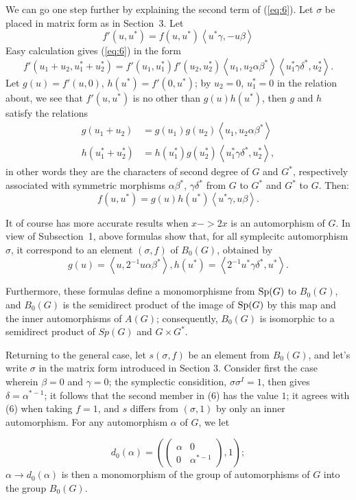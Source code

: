 \documentclass[12pt]{amsart}
\def\inn#1#2{\left\langle{#1},{#2}\right\rangle}
\def\Sp{{\rm Sp}}
\newcounter{ssection}
\renewcommand{\subsection}{
  \addtocounter{ssection}{1}{\bf  \arabic{ssection}.\  }}
\begin{document}
 	
We can go one step further by explaining the second term of (\ref{eq:6}).
Let $\sigma$ be placed in matrix form as in Section~$3$. Let
\[
f'(u,u^*)=f(u,u^*)\inn{u^*\gamma}{-u\beta}
\]
Easy calculation gives (\ref{eq:6}) in the form
\[
f'(u_1+u_2, u^*_1+u^*_2) = f'(u_1,u^*_1)f'(u_2,u^*_2)\inn{u_1}{u_2\alpha\beta^*}
\inn{u^*_1\gamma\delta^*}{u^*_2}.
\]
Let $g(u) = f'(u,0)$, $h(u^*)=f'(0,u^*)$; by $u_2=0$, $u_1^*=0$ in the relation
about, we see that $f'(u,u^*)$ is no other than $g(u)h(u^*)$, then $g$ and $h$
satisfy the relations
\begin{align*}
g(u_1+u_2)&=g(u_1)g(u_2)\inn{u_1}{u_2\alpha\beta^*}\\
h(u^*_1+u^*_2)&=h(u^*_1)g(u^*_2)\inn{u^*_1\gamma\delta^*}{u^*_2},
\end{align*}
in other words they are the characters of second degree of $G$ and $G^*$,
respectively associated with symmetric morphisms $\alpha\beta^*$, 
$\gamma\delta^*$ from $G$ to $G^*$ and $G^*$ to $G$. Then:
\[
f(u,u^*)=g(u)h(u^*)\inn{u^*\gamma}{u\beta}.
\]
	
It of course has more accurate results when $x-> 2x$ is an automorphism of $G$.
In view of Subsection~1, above formulas show that,
 for all symplecitc automorphism $\sigma$, it correspond to an element 
$(\sigma, f)$ of $B_0(G)$, obtained by
\[
g(u)=\inn{u}{2^{-1}u\alpha\beta^*}, h(u^*)=\inn{2^{-1}u^*\gamma\delta^*}{u^*}.
\]
	
Furthermore, these formulas define a monomorphisme from $\Sp(G)$ to $B_0(G)$, 
and $B_0(G)$ is the semidirect product of the image of $\Sp(G)$ by this map 
and the inner automorphisms of $A(G)$; consequently, 
$B_0(G)$ is isomorphic to a semidirect product of $Sp (G)$ and  $G\times G^*$.

\subsection{}
Returning to the general case, let $s(\sigma,f)$ be an element from
$B_{0}(G)$, and let's write $\sigma$ in the matrix form introduced
in Section 3. Consider first the case wherein $\beta=0$ and $\gamma=0$;
the symplectic considition, $\sigma\sigma^{I}=1$, then gives $\delta=\alpha^{*-1}$;
it follows that the second member in (6) has the value $1$; it agrees
with (6) when taking $f=1$, and $s$ differs from $(\sigma,1)$ by
only an inner automorphism. For any automorphism $\alpha$ of $G$,
we let

\[
d_{0}(\alpha)=\left(\left(\begin{array}{cc}
\alpha & 0\\
0 & \alpha^{*-1}\end{array}\right),1\right);\]
$\alpha\rightarrow d_{0}(\alpha)$ is then a monomorphism of the group
of automorphisms of $G$ into the group $B_{0}(G)$.
\end{document}
